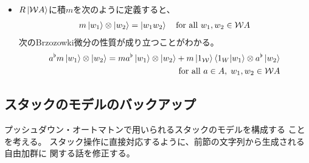 {\begin{itemize}
\begin{alignat*}{2}
			\bra{b_1\cdots b_n}a^\flat &= \bra{ab_2\cdots b_n} 
			&\quad& \text{for all } a, b_1, \dots, b_n\in A
		\end{alignat*}
		この定義は$RA$と$RA^\flat$の関係と次の意味でコンパチブルとなっている。
		\begin{equation*}\begin{split}
			a^\flat b = \jump{a = b} \quad\text{for all } a,b\in A
		\end{split}\end{equation*}
		$RA$の$R\ket{\W A}$への作用を$R\W A$の$R\ket{\W A}$への作用に拡張して
		次のように定義し、
		\begin{equation*}\begin{split}
			w_1\ket{w_2} = \ket{w_1w_2} \quad\text{for all } w_1,w_2\in \W A
		\end{split}\end{equation*}
		$RA^\flat$の$R\ket{\W A}$への作用を$R\W A^\flat$の$R\ket{\W A}$への
		作用に拡張して次のように定義する。
		\begin{equation*}\begin{split}
			w_1^\flat\ket{w_2} = \begin{cases}
				\ket{w}, &\text{ iff there exist } w\in\W A \text{ such that } 
				w_2 = w_1w \\
				0, &\text{ otherwise } \\
			\end{cases}
		\end{split}\end{equation*}
		\item $R\ket{\W A}$に積$m$を次のように定義すると、
		\begin{equation*}\begin{split}
			m \mathinner{|{w_1}\rangle}\otimes\mathinner{|{w_2}\rangle} = \mathinner{|{w_1w_2}\rangle}
			\quad\text{for all } w_1,w_2\in{\ensuremath{{\mathcal{W}}}} A
		\end{split}\end{equation*}
		次のBrzozowki微分の性質が成り立つことがわかる。
		\begin{equation*}\begin{split}
			a^\flat m \mathinner{|{w_1}\rangle}\otimes\mathinner{|{w_2}\rangle} 
			=  m a^\flat\mathinner{|{w_1}\rangle}\otimes\mathinner{|{w_2}\rangle} 
			+  m \mathinner{|{1_{\ensuremath{{\mathcal{W}}}}}\rangle}\mathinner{\langle{1_W|w_1}\rangle}\otimes a^\flat\mathinner{|{w_2}\rangle} \\
			\quad\text{for all } a\in A,\; w_1,w_2\in{\ensuremath{{\mathcal{W}}}} A
		\end{split}\end{equation*}
	\end{itemize} %
\subsection{スタックのモデルのバックアップ}\label{s2:スタックのモデルのバックアップ} %
	プッシュダウン・オートマトンで用いられるスタックのモデルを構成する
	ことを考える。
	スタック操作に直接対応するように、前節の文字列から生成される自由加群に
	関する話を修正する。

}
